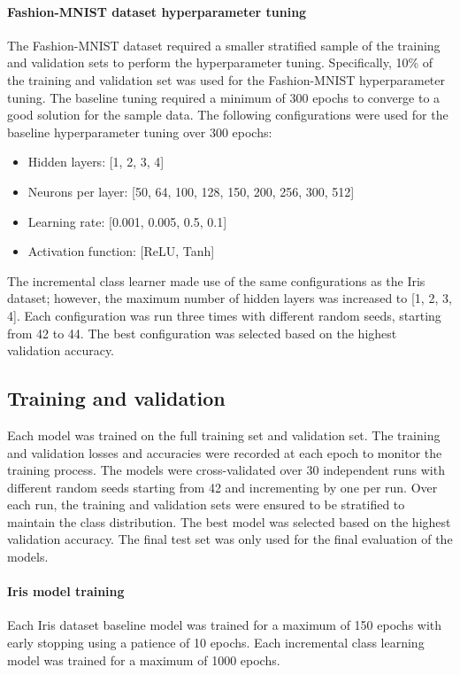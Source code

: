 \documentclass[conference]{IEEEtran}
\begin{document}
\paragraph{Fashion-MNIST dataset hyperparameter tuning}
 The Fashion-MNIST dataset required a smaller stratified sample of the training and validation sets to perform the hyperparameter tuning. Specifically, 10\% of the training and validation set was used for the Fashion-MNIST hyperparameter tuning. The baseline tuning required a minimum of 300 epochs to 
 converge to a good solution for the sample data. 
The following configurations were used for the baseline hyperparameter tuning over 300 epochs:
\begin{itemize}
\item Hidden layers: [1, 2, 3, 4]
\item Neurons per layer: [50, 64, 100, 128, 150, 200, 256, 300, 512]
\item Learning rate: [0.001, 0.005, 0.5, 0.1]
\item Activation function: [ReLU, Tanh]
\end{itemize}
 The incremental class learner made use of the same configurations as the Iris dataset; however, the maximum 
 number of hidden layers was increased to [1, 2, 3, 4]. Each configuration was run three times with
 different random seeds, starting from 42 to 44. The best configuration was selected based on the highest validation accuracy.

\subsection{Training and validation}
Each model was trained on the full training set and validation set. The training and validation losses and accuracies were recorded 
at each epoch to monitor the training process.  The models were cross-validated over 30 independent runs with different random seeds starting from 42 and incrementing by one per run. Over each run, the training and validation sets 
were ensured to be stratified to maintain the class distribution. The best model was selected based on the highest validation accuracy. The final 
test set was only used for the final evaluation of the models. 

\paragraph{Iris model training}
 Each Iris dataset baseline model was trained for a maximum of 150 epochs with early stopping using a patience of 10 epochs. 
Each incremental class learning model was trained for a maximum of 1000 epochs.
\end{document}
